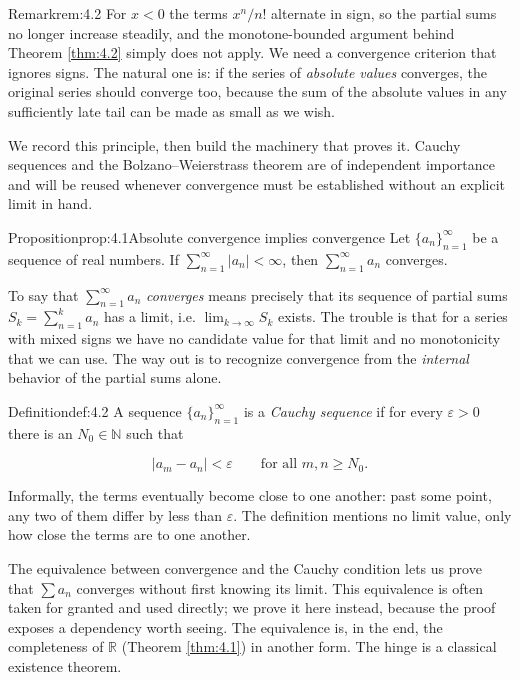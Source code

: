 \documentclass[a4paper,12pt,oneside]{memoir}
\begin{document}
\begin{envremark}{Remark}{rem:4.2}{}
For \(x < 0\) the terms \(x^{n}/n!\) alternate in sign, so the partial sums no longer increase steadily, and the monotone-bounded argument behind Theorem \ref{thm:4.2} simply does not apply. We need a convergence criterion that ignores signs. The natural one is: if the series of \emph{absolute values} converges, the original series should converge too, because the sum of the absolute values in any sufficiently late tail can be made as small as we wish.
\end{envremark}
We record this principle, then build the machinery that proves it. Cauchy sequences and the Bolzano–Weierstrass theorem are of independent importance and will be reused whenever convergence must be established without an explicit limit in hand.

\begin{envproposition}{Proposition}{prop:4.1}{Absolute convergence implies convergence}
Let \(\{a_{n}\}_{n=1}^{\infty}\) be a sequence of real numbers. If \(\displaystyle\sum_{n=1}^{\infty} \lvert a_{n} \rvert < \infty\), then \(\displaystyle\sum_{n=1}^{\infty} a_{n}\) converges.
\end{envproposition}
To say that \(\sum_{n=1}^{\infty} a_{n}\) \emph{converges} means precisely that its sequence of partial sums \(S_{k} = \sum_{n=1}^{k} a_{n}\) has a limit, i.e. \(\lim_{k \to \infty} S_{k}\) exists. The trouble is that for a series with mixed signs we have no candidate value for that limit and no monotonicity that we can use. The way out is to recognize convergence from the \emph{internal} behavior of the partial sums alone.

\begin{envdefinition}{Definition}{def:4.2}{}
A sequence \(\{a_{n}\}_{n=1}^{\infty}\) is a \emph{Cauchy sequence} if for every \(\varepsilon > 0\) there is an \(N_{0} \in \mathbb{N}\) such that

\[ \lvert a_{m} - a_{n} \rvert < \varepsilon \qquad \text{for all } m, n \ge N_{0}. \]

\begin{informal}
Informally, the terms eventually become close to one another: past some point, any two of them differ by less than \(\varepsilon\). The definition mentions no limit value, only how close the terms are to one another.
\end{informal}
\end{envdefinition}
The equivalence between convergence and the Cauchy condition lets us prove that \(\sum a_{n}\) converges without first knowing its limit. This equivalence is often taken for granted and used directly; we prove it here instead, because the proof exposes a dependency worth seeing. The equivalence is, in the end, the completeness of \(\mathbb{R}\) (Theorem \ref{thm:4.1}) in another form. The hinge is a classical existence theorem.
\end{document}
